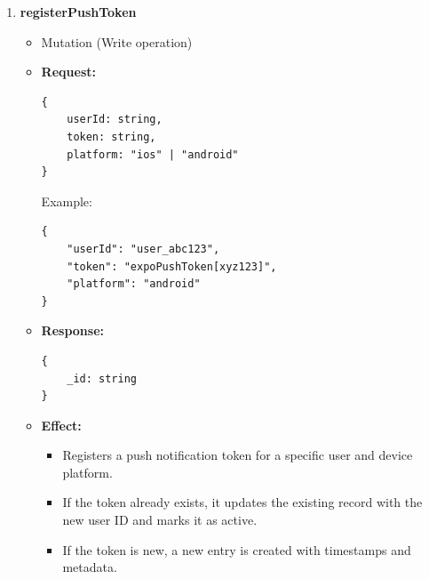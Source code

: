 \documentclass[a4paper,12pt]{article}
\begin{document}
\begin{enumerate}
    \item \textbf{registerPushToken}
    \begin{itemize}
        \item Mutation (Write operation)
        \item \textbf{Request:}
        \begin{verbatim}
{
    userId: string,
    token: string,
    platform: "ios" | "android"
}
        \end{verbatim}
        Example:
        \begin{verbatim}
{
    "userId": "user_abc123",
    "token": "expoPushToken[xyz123]",
    "platform": "android"
}
        \end{verbatim}
        \item \textbf{Response:}
        \begin{verbatim}
{
    _id: string
}
        \end{verbatim}
        \item \textbf{Effect:}
        \begin{itemize}
            \item Registers a push notification token for a specific user and device platform.
            \item If the token already exists, it updates the existing record with the new user ID and marks it as active.
            \item If the token is new, a new entry is created with timestamps and metadata.
        \end{itemize}
    \end{itemize}


\end{enumerate}
\end{document}
